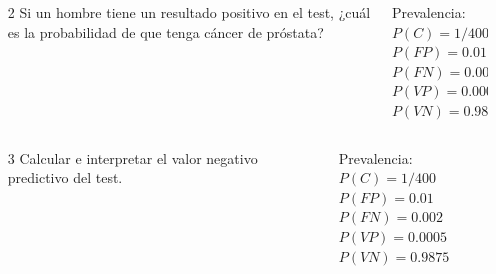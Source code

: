 \documentclass[aspectratio=169,10pt,t]{beamer}
\begin{document}
\begin{frame}
\begin{columns}
\begin{column}[T]{0.70\textwidth}
\begin{enumerate}
\item[2] Si un hombre tiene un resultado positivo en el test, ¿cuál es la probabilidad de que tenga cáncer de próstata?
\end{enumerate}
\end{column}
\begin{column}[T]{0.30\textwidth}
\begin{datos}
Prevalencia: $P(C)=1/400$\\
$P(FP) = 0.01$\\
$P(FN) = 0.002$\\
$P(VP) = 0.0005$\\
$P(VN) = 0.9875$
\end{datos}
\end{column}
\end{columns}
\end{frame}

\begin{frame}
\begin{columns}
\begin{column}[T]{0.70\textwidth}
\begin{enumerate}
\item[3] Calcular e interpretar el valor negativo predictivo del test.
\end{enumerate}
\end{column}
\begin{column}[T]{0.30\textwidth}
\begin{datos}
Prevalencia: $P(C)=1/400$\\
$P(FP) = 0.01$\\
$P(FN) = 0.002$\\
$P(VP) = 0.0005$\\
$P(VN) = 0.9875$
\end{datos}
\end{column}
\end{columns}
\end{frame}
\end{document}

